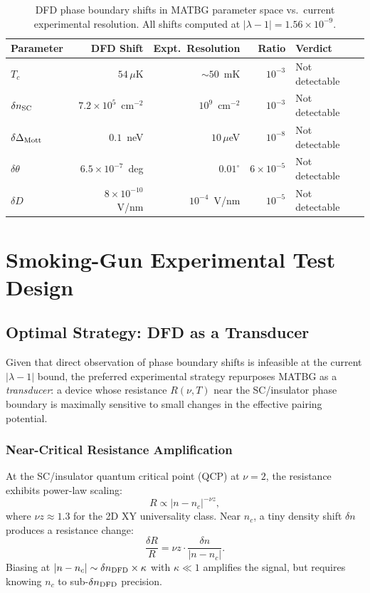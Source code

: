 \documentclass[11pt]{article}
\newcommand{\ee}[1]{\times 10^{#1}}
\newcommand{\nuFill}{\nu}
\newcommand{\Vmott}{\Delta_{\rm Mott}}
\newcommand{\lambdabound}{1.56\ee{-9}}
\begin{document}
\begin{table}[h!]
\centering
\caption{DFD phase boundary shifts in MATBG parameter space vs.\ current
experimental resolution. All shifts computed at $|\lambda-1| = \lambdabound$.}
\label{tab:phase_shifts}
\begin{tabular}{lrrrl}
\toprule
Parameter & DFD Shift & Expt.\ Resolution & Ratio & Verdict \\
\midrule
$T_c$ & $54\,\mu$K & $\sim 50$~mK & $10^{-3}$ & Not detectable \\
$\delta n_{\rm SC}$ & $7.2\ee{5}$~cm$^{-2}$ & $10^9$~cm$^{-2}$ & $10^{-3}$ & Not detectable \\
$\delta\Vmott$ & $0.1$~neV & $10\,\mu$eV & $10^{-8}$ & Not detectable \\
$\delta\theta$ & $6.5\ee{-7}$~deg & $0.01^\circ$ & $6\ee{-5}$ & Not detectable \\
$\delta D$ & $8\ee{-10}$~V/nm & $10^{-4}$~V/nm & $10^{-5}$ & Not detectable \\
\bottomrule
\end{tabular}
\end{table}

\section{Smoking-Gun Experimental Test Design}
\label{sec:smoking_gun}

\subsection{Optimal Strategy: DFD as a Transducer}

Given that direct observation of phase boundary shifts is infeasible at
the current $|\lambda-1|$ bound, the preferred experimental strategy
repurposes MATBG as a \emph{transducer}: a device whose resistance
$R(\nuFill, T)$ near the SC/insulator phase boundary is maximally
sensitive to small changes in the effective pairing potential.

\subsubsection{Near-Critical Resistance Amplification}

At the SC/insulator quantum critical point (QCP) at $\nuFill = 2$,
the resistance exhibits power-law scaling:
\begin{equation}
  R \propto |n - n_c|^{-\nu z},
  \label{eq:R_scaling}
\end{equation}
where $\nu z \approx 1.3$ for the 2D XY universality class. Near $n_c$,
a tiny density shift $\delta n$ produces a resistance change:
\begin{equation}
  \frac{\delta R}{R} = \nu z \cdot \frac{\delta n}{|n - n_c|}.
  \label{eq:dR}
\end{equation}
Biasing at $|n - n_c| \sim \delta n_{\rm DFD} \times \kappa$ with
$\kappa \ll 1$ amplifies the signal, but requires knowing $n_c$ to
sub-$\delta n_{\rm DFD}$ precision.
\end{document}
